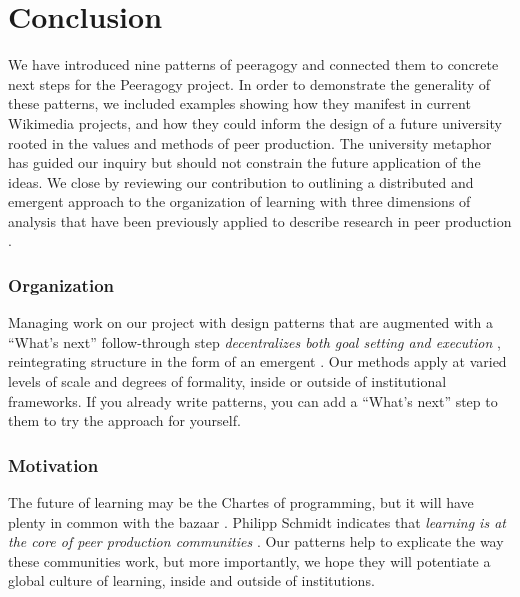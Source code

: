 \section{Conclusion}\label{sec:Conclusion}

We have introduced nine patterns of peeragogy and connected them to
concrete next steps for the Peeragogy project.  In order to
demonstrate the generality of these patterns, we included examples
showing how they manifest in current Wikimedia projects, and 
how they could inform the design of a future university rooted in the
values and methods of peer production.
%
%
The university metaphor has guided our inquiry but should not
constrain the future application of the ideas.
%
We close by reviewing our contribution to outlining a distributed
and emergent approach to the organization of learning with three
dimensions of analysis that have been previously applied to describe
research in peer production \cite{benkler2015peer}.

\vspace{-.25\baselineskip}

\subsubsection*{Organization} 
Managing work on our project with design patterns that are augmented
with a ``What's next'' follow-through step \emph{decentralizes both
  goal setting and execution} \cite{benkler2015peer}, reintegrating
structure in the form of an emergent .  Our
methods apply at varied levels of scale and degrees of formality,
inside or outside of institutional frameworks.  If you already write
patterns, you can add a ``What's next'' step to them to try the
approach for yourself.

\vspace{-.25\baselineskip}

\subsubsection*{Motivation}  The future of learning may be
the Chartes of programming, but it will have plenty in common with the
bazaar \cite{raymond2001cathedral}.
%
Philipp Schmidt indicates that \emph{learning is at the core of peer
  production communities} \cite{schmidt+commons-based+2009}.  Our
patterns help to explicate the way these communities work, but more
importantly, we hope they will potentiate a global culture of
learning, inside and outside of institutions.


